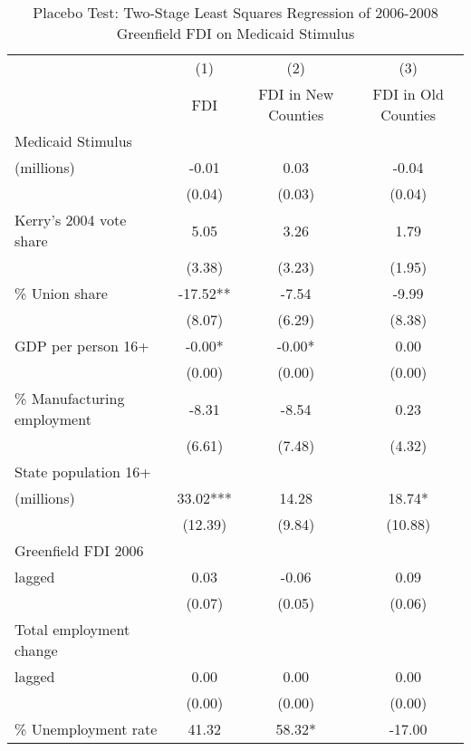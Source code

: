 \begin{table}[!htbp]\centering
\def\sym#1{\ifmmode^{#1}\else\(^{#1}\)\fi}
\caption{Placebo Test: Two-Stage Least Squares Regression of 2006-2008 Greenfield FDI on Medicaid Stimulus}
\begin{tabular}{l*{3}{c}}
\hline\hline
                    &\multicolumn{1}{c}{(1)}   &\multicolumn{1}{c}{(2)}   &\multicolumn{1}{c}{(3)}   \\
                    &         FDI   &FDI in New Counties   &FDI in Old Counties   \\
\hline
Medicaid Stimulus \\ (millions)&       -0.01   &        0.03   &       -0.04   \\
                    &      (0.04)   &      (0.03)   &      (0.04)   \\
Kerry's 2004 vote share&        5.05   &        3.26   &        1.79   \\
                    &      (3.38)   &      (3.23)   &      (1.95)   \\
\% Union share      &      -17.52** &       -7.54   &       -9.99   \\
                    &      (8.07)   &      (6.29)   &      (8.38)   \\
GDP per person 16+  &       -0.00*  &       -0.00*  &        0.00   \\
                    &      (0.00)   &      (0.00)   &      (0.00)   \\
\% Manufacturing employment&       -8.31   &       -8.54   &        0.23   \\
                    &      (6.61)   &      (7.48)   &      (4.32)   \\
 State population 16+ \\ (millions)&       33.02***&       14.28   &       18.74*  \\
                    &     (12.39)   &      (9.84)   &     (10.88)   \\
Greenfield FDI 2006 \\ lagged&        0.03   &       -0.06   &        0.09   \\
                    &      (0.07)   &      (0.05)   &      (0.06)   \\
Total employment change \\ lagged&        0.00   &        0.00   &        0.00   \\
                    &      (0.00)   &      (0.00)   &      (0.00)   \\
\% Unemployment rate&       41.32   &       58.32*  &      -17.00   \\

\end{tabular}
\end{table}
